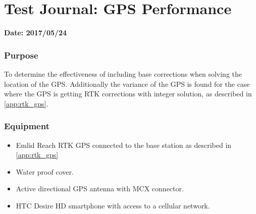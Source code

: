 \chapter{Test Journal: GPS Performance} \label{app:GPSImprovement}

\textbf{Date: 2017/05/24}

\subsection*{Purpose}
To determine the effectiveness of including base corrections when solving the location of the GPS. Additionally the variance of the GPS is found for the case where the GPS is getting RTK corrections with integer solution, as described in \autoref{app:rtk_gps}.

\subsection*{Equipment}
\begin{itemize}
	\item Emlid Reach RTK GPS connected to the base station as described in \autoref{app:rtk_gps}
    \item Water proof cover.
    \item Active directional GPS antenna with MCX connector.
    \item HTC Desire HD smartphone with access to a cellular network.
\end{itemize}

